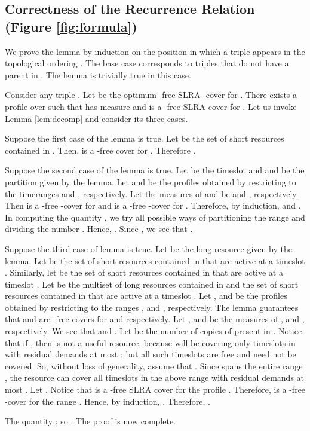 \documentclass[11pt]{article}
\newcommand{\qed} {\hfill}
\begin{document}
\subsection{Correctness of the Recurrence Relation (Figure \ref{fig:formula})}
\label{sec:recur-proof}
We prove the lemma by induction on the position in which a triple appears in the topological ordering .
The base case corresponds to triples that do not have a parent in . The lemma is trivially true in this case.

Consider any triple . Let  be the optimum -free SLRA -cover for .
There exists a profile  over  such that  has measure  and  is a -free SLRA cover
for . Let us invoke Lemma \ref{lem:decomp} and consider its three cases.

Suppose the first case of the lemma is true.
Let  be the set of short resources contained in . 
Then,  is a -free cover for . Therefore .

Suppose the second case of the lemma is true.
Let  be the timeslot and  and  be the partition given by the lemma.
Let  and  be the profiles obtained by restricting  to the timeranges  and ,
respectively. Let the measures of  and  be  and , respectively.
Then  is a -free -cover for  and  is a -free -cover for .
Therefore, by induction,  
and .
In computing the quantity , we try all possible ways of partitioning the range  and dividing the number .
Hence, . Since , we see that .

Suppose the third case of lemma is true.
Let  be the long resource given by the lemma.
Let  be the set of short resources contained in  that are active at a timeslot .
Similarly, let  be the set of short resources contained in  that are active at a timeslot .
Let  be the multiset of long resources contained in  and the set of short resources contained in 
that are active at a timeslot .
Let ,  and  be the profiles obtained by restricting  to the ranges ,
 and , respectively.
The lemma guarantees that  and  are -free covers for  and  respectively.
Let ,  and  be the measures of ,  and , respectively.
We see that  and .
Let  be the number of copies of  present in .
Notice that if , then  is not a useful resource,
because  will be covering only timeslots in  with residual demands at most ;
but all such timeslots are free and need not be covered.
So, without loss of generality, assume that .
Since  spans the entire range , 
the resource  can cover all timeslots in the above range with residual demands at most .
Let . Notice that  is a -free SLRA cover for the profile .
Therefore,  is a -free -cover for the range .
Hence, by induction, .
Therefore, .

The quantity ; so 
. The proof is now complete.
\qed
\end{document}
